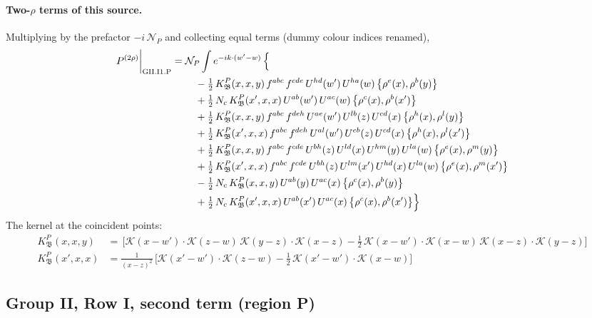 \documentclass[10pt]{article}
\numberwithin{equation}{section}
\newcommand{\KK}{\mathcal K}
\newcommand{\NP}{\mathcal N_{P}}
\begin{document}
\paragraph{Two-$\rho$ terms of this source.} Multiplying by the prefactor $-i\,\NP$ and collecting equal terms (dummy colour indices renamed),
\begin{align}
P^{(2\rho)}\bigg|_{\rm GII.I1.P}={}&\NP\int e^{-ik\cdot(w'-w)}\,\Big\{\notag\\
&\quad -\tfrac12\,K^{P}_{\mathfrak B}(x,x,y)\,f^{abc}\,f^{cde}\,U^{hd}(w')\,U^{ha}(w)\,\big\{\rho^{e}(x),\rho^{b}(y)\big\}\notag\\
&\quad +\tfrac12\,N_{c}\,K^{P}_{\mathfrak B}(x',x,x)\,U^{ab}(w')\,U^{ac}(w)\,\big\{\rho^{c}(x),\rho^{b}(x')\big\}\notag\\
&\quad +\tfrac12\,K^{P}_{\mathfrak B}(x,x,y)\,f^{abc}\,f^{deh}\,U^{ae}(w')\,U^{lb}(z)\,U^{cd}(x)\,\big\{\rho^{h}(x),\rho^{l}(y)\big\}\notag\\
&\quad +\tfrac12\,K^{P}_{\mathfrak B}(x',x,x)\,f^{abc}\,f^{deh}\,U^{al}(w')\,U^{eb}(z)\,U^{cd}(x)\,\big\{\rho^{h}(x),\rho^{l}(x')\big\}\notag\\
&\quad +\tfrac12\,K^{P}_{\mathfrak B}(x,x,y)\,f^{abc}\,f^{cde}\,U^{bh}(z)\,U^{ld}(x)\,U^{hm}(y)\,U^{la}(w)\,\big\{\rho^{e}(x),\rho^{m}(y)\big\}\notag\\
&\quad +\tfrac12\,K^{P}_{\mathfrak B}(x',x,x)\,f^{abc}\,f^{cde}\,U^{bh}(z)\,U^{lm}(x')\,U^{hd}(x)\,U^{la}(w)\,\big\{\rho^{e}(x),\rho^{m}(x')\big\}\notag\\
&\quad -\tfrac12\,N_{c}\,K^{P}_{\mathfrak B}(x,x,y)\,U^{ab}(y)\,U^{ac}(x)\,\big\{\rho^{c}(x),\rho^{b}(y)\big\}\notag\\
&\quad +\tfrac12\,N_{c}\,K^{P}_{\mathfrak B}(x',x,x)\,U^{ab}(x')\,U^{ac}(x)\,\big\{\rho^{c}(x),\rho^{b}(x')\big\}\Big\}\label{B:eq:res-GII.I1.P}
\end{align}
The kernel at the coincident points:
\begin{align*}
K^{P}_{\mathfrak B}(x,x,y)&=\,\Big[\KK(x-w')\cdot\KK(z-w)\,\KK(y-z)\cdot\KK(x-z)-\frac{1}{2}\,\KK(x-w')\cdot\KK(x-w)\,\KK(x-z)\cdot\KK(y-z)\Big]\\K^{P}_{\mathfrak B}(x',x,x)&=\frac{1}{(x-z)^2}\,\Big[\KK(x'-w')\cdot\KK(z-w)-\frac{1}{2}\,\KK(x'-w')\cdot\KK(x-w)\Big]
\end{align*}
\subsection{Group II, Row I, second term (region P)}\label{B:sec:GII.I2.P}
\end{document}
